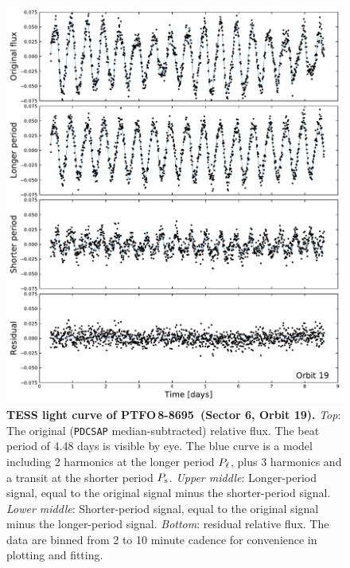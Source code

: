 \documentclass[12pt,twocolumn,tighten]{aastex62}
\newcommand{\ptfo}{PTFO$\,$8-8695}
\begin{document}
\begin{figure}[t!]
	\begin{center}
		\leavevmode
		\includegraphics[width=1\textwidth]{f1.pdf}
	\end{center}
	\vspace{-0.7cm}
	\caption{
    {\bf TESS light curve of \ptfo\ (Sector 6, Orbit 19).} {\it Top}:
    The original (\texttt{PDCSAP} median-subtracted) relative flux.
    The beat period of 4.48 days is visible by eye.  The blue curve is
    a model including 2 harmonics at the longer period $P_{\rm \ell}$,
    plus 3 harmonics and a transit at the shorter period $P_{\rm s}$.
    {\it Upper middle}: Longer-period signal, equal to the original
    signal minus the shorter-period signal.  {\it Lower middle}:
    Shorter-period signal, equal to the original signal minus the
    longer-period signal.  {\it Bottom}: residual relative flux.  The
    data are binned from 2 to 10 minute cadence for convenience in
    plotting and fitting.
		\label{fig:splitsignal}
	}
\end{figure}
\end{document}
